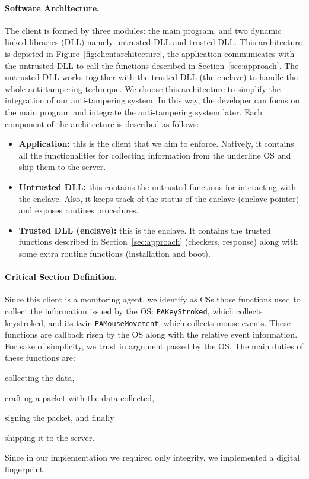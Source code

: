 \paragraph{Software Architecture.}
The client is formed by three modules: the main program, and two dynamic linked 
libraries (DLL) namely untrusted DLL and trusted DLL. %
This architecture is depicted in Figure~\ref{fig:clientarchitecture},
the application communicates with the untrusted DLL to call the functions 
described in Section~\ref{sec:approach}.
The untrusted DLL works together with the trusted DLL (\ie the enclave) to 
handle the whole anti-tampering technique.
We choose this architecture to
simplify the integration of our anti-tampering system.
In this way, the developer can focus on the main program
and integrate the anti-tampering system later.
Each component of the architecture is described as follows:
\begin{itemize}
	\item \textbf{Application:} this is the client that we aim to enforce. 
	Natively, 
	it contains all the functionalities for collecting information from the 
	underline OS and ship them to the server.
	\item \textbf{Untrusted DLL:} this contains the untrusted functions for 
	interacting with the enclave. Also, it keeps track of the status of the 
	enclave (\ie enclave pointer) and exposes routines procedures.
	\item \textbf{Trusted DLL (enclave):} this is the enclave. It contains the 
	trusted functions described in Section~\ref{sec:approach} (\eg checkers, 
	response) along with some extra routine functions (\ie installation and 
	boot).
\end{itemize}

\paragraph{Critical Section Definition.}
Since this client is a monitoring agent, we identify as CSs those
functions used to collect the information issued by the OS:
\texttt{PAKeyStroked}, which collects keystroked, and its twin 
\texttt{PAMouseMovement},
which collects mouse events.
These functions are callback risen by the OS along with the relative event 
information.
For sake of simplicity, we trust in argument passed by the OS.
The main duties of these functions are:
\begin{enumerate*}[label=(\roman*)]
	\item collecting the data,
	\item crafting a packet with the data collected,
	\item signing the packet, and finally
	\item shipping it to the server.
\end{enumerate*}
Since in our implementation we required only integrity, we implemented a 
digital fingerprint.

